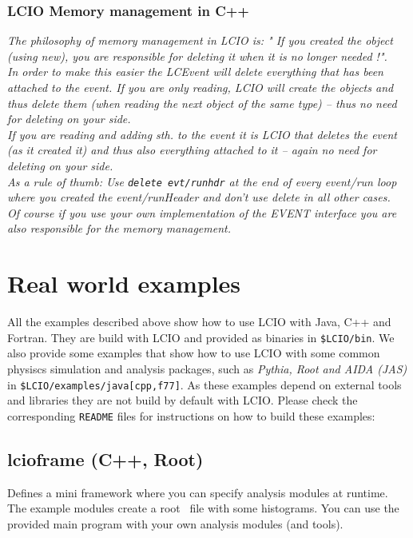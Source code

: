 \documentclass[twoside]{article}
\begin{document}
\subsubsection{ LCIO Memory management in C++} \label{cppmem}
{\em The philosophy of memory management in LCIO is: " If you created the object (using new),
you are responsible for deleting it when it is no longer needed !".\\
In order to make this easier the LCEvent will delete everything that has been attached to the event.
If you are only reading, LCIO will create the objects and thus delete them (when reading the next 
object of the same type) -- thus no need for deleting on your side.\\
If you are reading and adding sth. to the event it is  LCIO that deletes the event 
(as it created it) and thus also everything attached to it -- again no need for deleting on your 
side.\\
As a rule of thumb: Use \verb$delete evt/runhdr$ at the end of every event/run loop where you 
created the event/runHeader and don't use delete in all other cases.\\
Of course if you use your own implementation of the EVENT interface you are also responsible for the 
memory management.}
 




\section{Real world examples} \label{realworld}
All the examples described above show how to use LCIO with Java, C++ and Fortran. They are build 
with LCIO and provided as binaries in \verb#$LCIO/bin#.
We also provide some examples that show how to use LCIO with some common physiscs simulation
and analysis packages, such as {\em  Pythia, Root and AIDA (JAS)} in 
\verb#$LCIO/examples/java[cpp,f77]#.
As these examples depend on external tools and libraries they are not build by default with LCIO.
Please check the corresponding \verb$README$ files for instructions on how to build these examples:


\subsection{lcioframe (C++, Root)} \label{rwlcioframe}

Defines a mini framework where you can specify analysis modules at 
runtime.
The example modules create a root~\cite{ref_root} file with some histograms. 
You can use the provided main program with your own analysis modules (and tools). 
\end{document}
